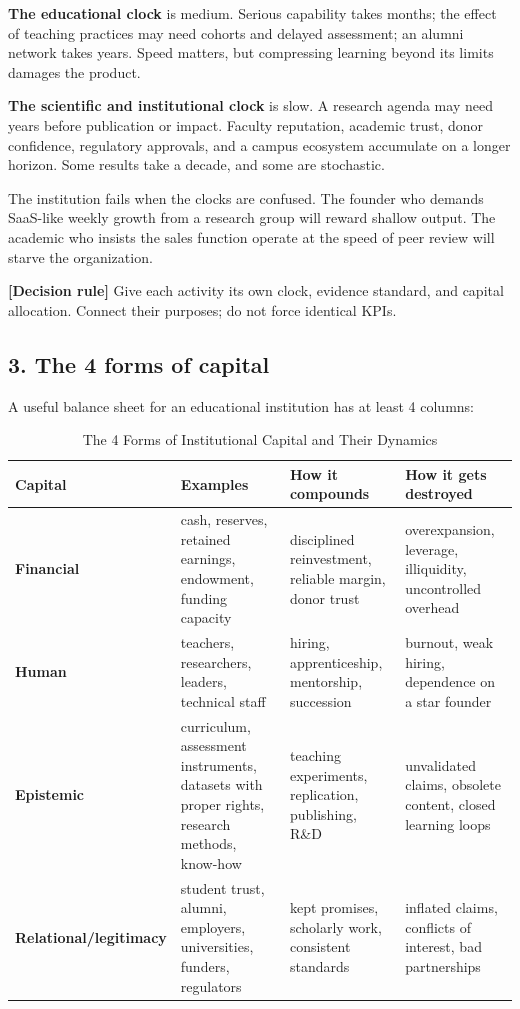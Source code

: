 \textbf{The educational clock} is medium. Serious capability takes months; the effect of teaching practices may need cohorts and delayed assessment; an alumni network takes years. Speed matters, but compressing learning beyond its limits damages the product.

\textbf{The scientific and institutional clock} is slow. A research agenda may need years before publication or impact. Faculty reputation, academic trust, donor confidence, regulatory approvals, and a campus ecosystem accumulate on a longer horizon. Some results take a decade, and some are stochastic.

The institution fails when the clocks are confused. The founder who demands SaaS-like weekly growth from a research group will reward shallow output. The academic who insists the sales function operate at the speed of peer review will starve the organization.

\textbf{\textbf{[Decision rule]}} Give each activity its own clock, evidence standard, and capital allocation. Connect their purposes; do not force identical KPIs.

\subsection{3. The 4 forms of capital}

A useful balance sheet for an educational institution has at least 4 columns:

\begin{table}[t]
\centering
\small
\caption{The 4 Forms of Institutional Capital and Their Dynamics}
\label{tab:ch36_four_capitals}
\begin{tabularx}{\textwidth}{p{2.8cm} p{4.0cm} p{4.0cm} X}
\toprule
\textbf{ Capital } & \textbf{ Examples } & \textbf{ How it compounds } & \textbf{ How it gets destroyed } \\
\midrule
 \textbf{Financial}  &  cash, reserves, retained earnings, endowment, funding capacity  &  disciplined reinvestment, reliable margin, donor trust  &  overexpansion, leverage, illiquidity, uncontrolled overhead  \\
 \textbf{Human}  &  teachers, researchers, leaders, technical staff  &  hiring, apprenticeship, mentorship, succession  &  burnout, weak hiring, dependence on a star founder  \\
 \textbf{Epistemic}  &  curriculum, assessment instruments, datasets with proper rights, research methods, know-how  &  teaching experiments, replication, publishing, R\&D  &  unvalidated claims, obsolete content, closed learning loops  \\
 \textbf{Relational/\allowbreak legitimacy}  &  student trust, alumni, employers, universities, funders, regulators  &  kept promises, scholarly work, consistent standards  &  inflated claims, conflicts of interest, bad partnerships  \\
\bottomrule
\end{tabularx}
\end{table}

